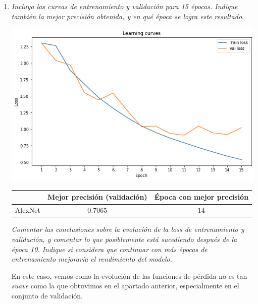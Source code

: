 \documentclass[11pt]{article}
\begin{document}
\begin{enumerate}
    \item \emph{Incluya las curvas de entrenamiento y validación para 15 épocas. Indique también la mejor     precisión obtenida, y en qué época se logra este resultado}.
        \begin{center}
            \includegraphics[scale = 0.5]{imgs/cifar_loss_curve.png}
        \end{center}
        \begin{table}[H]
            \centering
            \begin{tabular}{c|cc}
                            & \textbf{Mejor precisión (validación)} & \textbf{Época con mejor precisión} \\ \hline
                 AlexNet &     \( 0.7065 \)       &    \( 14 \)        \\
            \end{tabular}
        \end{table}
        \emph{Comentar las conclusiones sobre la evolución de la loss de entrenamiento y validación, y comentar lo que posiblemente está sucediendo después de la época 10. Indique si considera que continuar con más épocas de entrenamiento mejoraría el rendimiento del modelo.}

        En este caso, vemos como la evolución de las funciones de pérdida no es tan \emph{suave} como la que obtuvimos en el apartado anterior, especialmente en el conjunto de validación. 


\end{enumerate}
\end{document}
